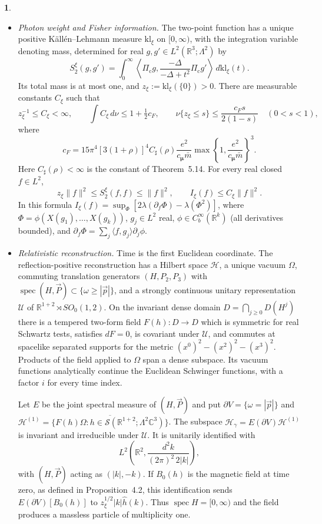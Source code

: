 \documentclass[11pt]{amsart}
\newcommand{\namedhead}{}
\theoremstyle{definition}
\newtheorem*{namedinner}{\namedhead}
\newenvironment{named}[1]{\renewcommand{\namedhead}{#1}\begin{namedinner}}{\end{namedinner}}
\begin{document}
\begin{named}{Theorem A}
\begin{itemize}
\item[(ii)] \emph{Photon weight and Fisher information.}
The two-point function has a unique positive K\"all\'en--Lehmann measure
$\mathrm{kl}_\xi$ on $[0,\infty)$, with the integration variable denoting
mass, determined for real $g,g'\in L^2(\mathbb R^3;\Lambda^2)$ by
\[
S_2^\xi(g,g')=\int_0^\infty
\left\langle\Pi_{\mathrm c}g,\frac{-\Delta}{-\Delta+t^2}
\Pi_{\mathrm c}g'\right\rangle\,d\mathrm{kl}_\xi(t).
\]
Its total mass is at most one, and
$z_\xi:=\mathrm{kl}_\xi(\{0\})>0$.
There are measurable constants $C_\xi$ such that
\[
z_\xi^{-1}\le C_\xi<\infty,\qquad
\int C_\xi\,d\nu\le1+\tfrac12c_F,\qquad
\nu\{z_\xi\le s\}\le\frac{c_Fs}{2(1-s)}\quad(0<s<1),
\]
where
\[
c_F=15\pi^4[3(1+\rho)]^4C_\sharp(\rho)
\frac{e^2}{c_{\boldsymbol\mu}\bar m}
\max\left\{1,\frac{e^2}{c_{\boldsymbol\mu}\bar m}\right\}^3.
\]
Here $C_\sharp(\rho)<\infty$ is the constant of Theorem~5.14.
For every real closed $f\in L^2$,
\[
z_\xi\|f\|^2\le S_2^\xi(f,f)\le\|f\|^2,
\qquad I_\xi(f)\le C_\xi\|f\|^2.
\]
In this formula
$I_\xi(f)=\sup_\Phi[2\lambda(\partial_f\Phi)-\lambda(\Phi^2)]$,
where $\Phi=\phi(X(g_1),\dots,X(g_k))$, $g_j\in L^2$ real,
$\phi\in C_b^\infty(\mathbb R^k)$ (all derivatives bounded), and
$\partial_f\Phi=\sum_j\langle f,g_j\rangle\partial_j\phi$.

\item[(iii)] \emph{Relativistic reconstruction.}
Time is the first Euclidean coordinate. The reflection-positive
reconstruction has a Hilbert space $\mathcal H$, a unique vacuum
$\Omega$, commuting translation generators $(H,P_2,P_3)$ with
$\operatorname{spec}(H,\vec P)\subset\{\omega\ge|\vec p|\}$,
and a strongly continuous unitary representation $\mathcal U$ of
$\mathbb R^{1+2}\rtimes SO_0(1,2)$.
On the invariant dense domain $D=\bigcap_{j\ge0}D(H^j)$ there is a
tempered two-form field $F(h):D\to D$ which is symmetric for real
Schwartz tests, satisfies $dF=0$, is covariant under $\mathcal U$, and
commutes at spacelike separated supports for the metric
$(x^0)^2-(x^2)^2-(x^3)^2$.
Products of the field applied to $\Omega$ span a dense subspace.
Its vacuum functions analytically continue the Euclidean Schwinger
functions, with a factor $i$ for every time index.

Let $E$ be the joint spectral measure of $(H,\vec P)$ and put
$\partial V=\{\omega=|\vec p|\}$ and
$\mathcal H^{(1)}=\allowbreak \overline{\{F(h)\Omega:h\in\mathcal S(\mathbb R^{1+2};\Lambda^2\mathbb C^3)\}}$.
The subspace $\mathcal H_\gamma=E(\partial V)\mathcal H^{(1)}$ is
invariant and irreducible under $\mathcal U$. It is unitarily identified with
\[
L^2\left(\mathbb R^2,\frac{d^2k}{(2\pi)^2\,2|k|}\right),
\]
with $(H,\vec P)$ acting as $(|k|,-k)$. If $B_0(h)$ is the magnetic field
at time zero, as defined in Proposition~4.2, this identification sends
$E(\partial V)[B_0(h)]$ to $z_\xi^{1/2}|k|\hat h(k)$.
Thus $\operatorname{spec}H=[0,\infty)$ and the field produces a
massless particle of multiplicity one.


\end{itemize}
\end{named}
\end{document}
